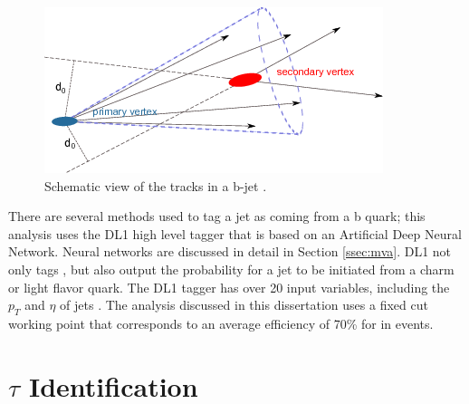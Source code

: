 			\begin{figure}[!ht]
			\centering
			\includegraphics[width=.5\textwidth,keepaspectratio=true]{chapters/chapter5_eventreconnstruction/images/b-jet-schetch.png}
			\caption{\label{fig:bjet} Schematic view of the tracks in a b-jet \cite{bjet-trigger}.}
			\end{figure}

		There are several methods used to tag a jet as coming from a b quark; this analysis uses the DL1 high level tagger \cite{b-tagging} that is based on an Artificial Deep Neural Network. Neural networks are discussed in detail in Section \ref{ssec:mva}. DL1 not only tags \bjets, but also output the probability for a jet to be initiated from a charm or light flavor quark. The DL1 tagger has over 20 input variables, including the $p_{T}$ and $\eta$ of jets \cite{b-tagging-input-variables}. The analysis discussed in this dissertation uses a fixed cut working point that corresponds to an average efficiency of 70\% for \bjets in \ttbar events.


	\section{$\tau$ Identification}\label{ssec:reco-tau}
	

	\section{\Etm}\label{sec:reco-etmiss}
	\cite{met-perf}